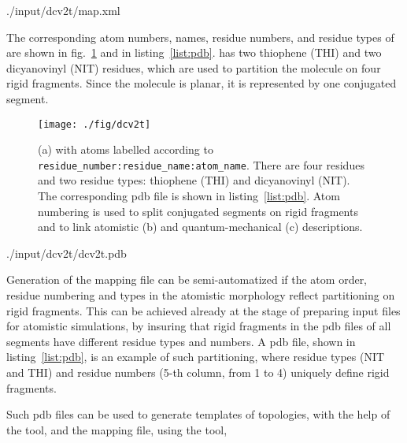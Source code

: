 \newpage
%
{./input/dcv2t/map.xml}
\vfill

The corresponding atom numbers, names, residue numbers, and residue types of  \dcvt are shown in fig.~\ref{fig:dcv2t} and in listing~\ref{list:pdb}. \dcvt has two thiophene (THI) and two dicyanovinyl (NIT) residues, which are used to partition the molecule on four rigid fragments. Since the molecule is planar, it is represented by one conjugated segment.

\newpage
\begin{figure}[ht]
\centering
\texttt{[image: ./fig/dcv2t]}
\caption{\small (a) \dcvt with atoms labelled according to \texttt{residue\_number:residue\_name:atom\_name}. 
There are four residues and two residue types: thiophene (THI) and dicyanovinyl (NIT). The corresponding pdb file is shown in listing~\ref{list:pdb}. Atom numbering is used to split conjugated segments on rigid fragments and to link atomistic (b) and quantum-mechanical (c) descriptions.}
\label{fig:dcv2t}
\end{figure}

%
{./input/dcv2t/dcv2t.pdb}
\vfill

Generation of the mapping file can be semi-automatized if the atom order, residue numbering and types in the atomistic morphology reflect partitioning on rigid fragments.  This can be achieved already at the stage of preparing input files for atomistic simulations, by insuring that rigid fragments in the pdb files of all segments have   different residue types and numbers. A \dcvt pdb file, shown in listing~\ref{list:pdb}, is an example of such partitioning, where residue types (NIT and THI) and residue numbers (5-th column, from 1 to 4) uniquely define rigid fragments.

Such pdb files can be used to generate templates of \gromacs topologies, with the help of the  tool,
and the mapping file, using the  tool, 

